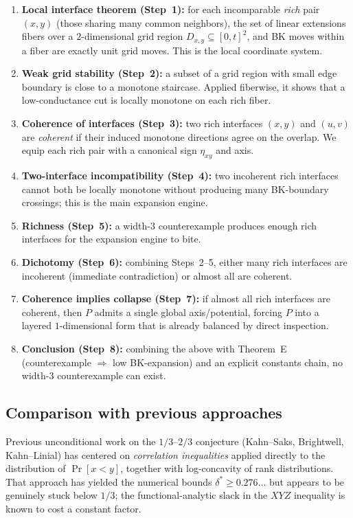 \documentclass[11pt]{article}
\theoremstyle{definition}
\theoremstyle{remark}
\newcommand{\Dxy}{D_{x,y}}
\begin{document}
\begin{enumerate}[label=\textbf{(\arabic*)},leftmargin=2em]
  \item \textbf{Local interface theorem (Step~1):} for each
    incomparable \emph{rich} pair $(x,y)$ (those sharing many common
    neighbors), the set of linear extensions fibers over a
    $2$-dimensional grid region $\Dxy\subseteq[0,t]^2$, and BK moves
    within a fiber are exactly unit grid moves.  This is the local
    coordinate system.
  \item \textbf{Weak grid stability (Step~2):} a subset of a grid
    region with small edge boundary is close to a monotone
    staircase.  Applied fiberwise, it shows that a low-conductance
    cut is locally monotone on each rich fiber.
  \item \textbf{Coherence of interfaces (Step~3):} two rich
    interfaces $(x,y)$ and $(u,v)$ are \emph{coherent} if their
    induced monotone directions agree on the overlap.  We equip each
    rich pair with a canonical sign $\eta_{xy}$ and axis.
  \item \textbf{Two-interface incompatibility (Step~4):} two
    incoherent rich interfaces cannot both be locally monotone
    without producing many BK-boundary crossings; this is the main
    expansion engine.
  \item \textbf{Richness (Step~5):} a width-$3$ counterexample
    produces enough rich interfaces for the expansion engine to
    bite.
  \item \textbf{Dichotomy (Step~6):} combining Steps~2--5, either
    many rich interfaces are incoherent (immediate contradiction) or
    almost all are coherent.
  \item \textbf{Coherence implies collapse (Step~7):} if almost all
    rich interfaces are coherent, then $P$ admits a single global
    axis/potential, forcing $P$ into a layered $1$-dimensional form
    that is already balanced by direct inspection.
  \item \textbf{Conclusion (Step~8):} combining the above with
    Theorem~E (counterexample $\Rightarrow$ low BK-expansion) and an
    explicit constants chain, no width-$3$ counterexample can exist.
\end{enumerate}

\subsection{Comparison with previous approaches}

Previous unconditional work on the $1/3$--$2/3$ conjecture
(Kahn--Saks, Brightwell, Kahn--Linial) has centered on
\emph{correlation inequalities} applied directly to the distribution
of $\Pr[x<y]$, together with log-concavity of rank
distributions.  That approach has yielded the numerical bounds
$\delta^*\ge 0.276\ldots$ but appears to be genuinely stuck below
$1/3$; the functional-analytic slack in the $XYZ$ inequality is known
to cost a constant factor.
\end{document}
